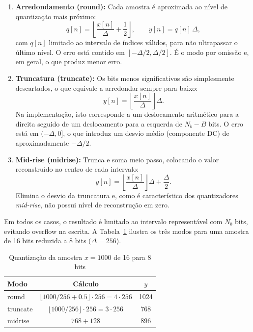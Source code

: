 \documentclass[11pt,a4paper]{report}
\begin{document}
\begin{enumerate}
    \item \textbf{Arredondamento (round):}
    Cada amostra é aproximada ao nível de quantização mais próximo:
    \[
    q[n] = \left\lfloor \frac{x[n]}{\Delta} + \frac{1}{2} \right\rfloor, \qquad y[n] = q[n]\,\Delta,
    \]
    com $q[n]$ limitado ao intervalo de índices válidos, para não ultrapassar o último nível. O erro está contido em $[-\Delta/2, \Delta/2]$. É o modo por omissão e, em geral, o que produz menor erro.

    \item \textbf{Truncatura (truncate):}
    Os bits menos significativos são simplesmente descartados, o que equivale a arredondar sempre para baixo:
    \[
    y[n] = \left\lfloor \frac{x[n]}{\Delta} \right\rfloor \Delta.
    \]
    Na implementação, isto corresponde a um deslocamento aritmético para a direita seguido de um deslocamento para a esquerda de $N_b - B$ bits. O erro está em $(-\Delta, 0]$, o que introduz um desvio médio (componente DC) de aproximadamente $-\Delta/2$.

    \item \textbf{Mid-rise (midrise):}
    Trunca e soma meio passo, colocando o valor reconstruído no centro de cada intervalo:
    \[
    y[n] = \left\lfloor \frac{x[n]}{\Delta} \right\rfloor \Delta + \frac{\Delta}{2}.
    \]
    Elimina o desvio da truncatura e, como é característico dos quantizadores \emph{mid-rise}, não possui nível de reconstrução em zero.
\end{enumerate}

Em todos os casos, o resultado é limitado ao intervalo representável com $N_b$ bits, evitando overflow na escrita. A Tabela~\ref{tab:quant_exemplo} ilustra os três modos para uma amostra de 16 bits reduzida a 8 bits ($\Delta = 256$).

\begin{table}[H]
\centering
\begin{tabular}{lcc}
\toprule
Modo & Cálculo & $y$ \\
\midrule
round & $\lfloor 1000/256 + 0.5 \rfloor \cdot 256 = 4 \cdot 256$ & 1024 \\
truncate & $\lfloor 1000/256 \rfloor \cdot 256 = 3 \cdot 256$ & 768 \\
midrise & $768 + 128$ & 896 \\
\bottomrule
\end{tabular}
\caption{Quantização da amostra $x = 1000$ de 16 para 8 bits}
\label{tab:quant_exemplo}
\end{table}
\end{document}
